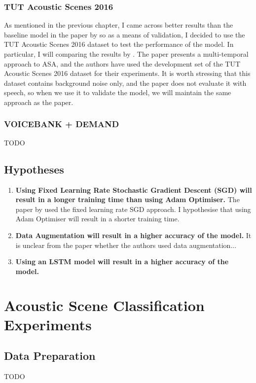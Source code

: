 \documentclass[logo,bsc,singlespacing,parskip,online]{infthesis}
\begin{document}
\subsection{TUT Acoustic Scenes 2016}
As mentioned in the previous chapter, I came across better results than the baseline model in the paper by \citet{Huwel2020HearDS} 
so as a means of validation, I decided to use the TUT Acoustic Scenes 2016 dataset \cite{mesaros_tut_2016} to test the performance of the model.
In particular, I will comparing the results by \citet{schindler_multi-temporal_2018}. The paper presents a multi-temporal approach to ASA, and 
the authors have used the development set of the TUT Acoustic Scenes 2016 dataset for their experiments. It is worth stressing 
that this dataset contains background noise only, and the paper does not evaluate it with speech, so when we use it to validate 
the model, we will maintain the same approach as the paper.

\subsection{VOICEBANK + DEMAND}
TODO

\section{Hypotheses}

\begin{enumerate}
   \item \textbf{Using Fixed Learning Rate Stochastic Gradient Descent (SGD) will result in a longer training time than using Adam Optimiser.} The paper by \citet{Huwel2020HearDS} used the fixed learning rate SGD approach.
   I hypothesise that using Adam Optimiser will result in a shorter training time.
   \item \textbf{Data Augmentation will result in a higher accuracy of the model.} It is unclear from the paper whether the authors used data augmentation...
   \item \textbf{Using an LSTM model will result in a higher accuracy of the model.}
\end{enumerate}


\chapter{Acoustic Scene Classification Experiments}
\label{chap:acoustic-scene-classification}
\section{Data Preparation}
TODO
\end{document}
